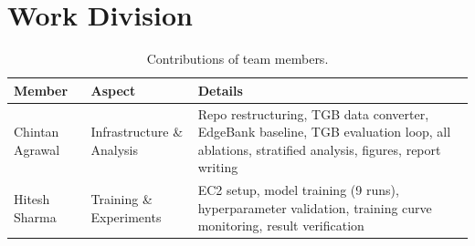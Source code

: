 \documentclass[10pt,twocolumn]{article}
\begin{document}
\section{Work Division}

\begin{table}[h]
\centering
\caption{Contributions of team members.}
\small
\begin{tabular}{p{2cm}p{2cm}p{3.5cm}}
\toprule
\textbf{Member} & \textbf{Aspect} & \textbf{Details} \\
\midrule
Chintan Agrawal & Infrastructure \& Analysis & Repo restructuring, TGB data converter, EdgeBank baseline, TGB evaluation loop, all ablations, stratified analysis, figures, report writing \\
\midrule
Hitesh Sharma & Training \& Experiments & EC2 setup, model training (9 runs), hyperparameter validation, training curve monitoring, result verification \\
\bottomrule
\end{tabular}
\end{table}
\end{document}
